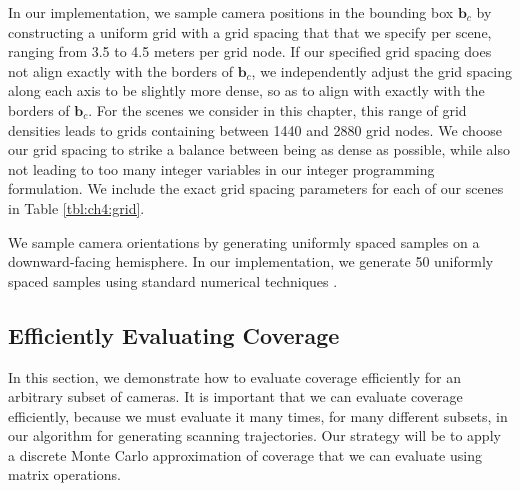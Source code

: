 In our implementation, we sample camera positions in the bounding box $\mathbf{b}_c$ by constructing a uniform grid with a grid spacing that that we specify per scene, ranging from 3.5 to 4.5 meters per grid node.
If our specified grid spacing does not align exactly with the borders of $\mathbf{b}_c$, we independently adjust the grid spacing along each axis to be slightly more dense, so as to align with exactly with the borders of $\mathbf{b}_c$.
For the scenes we consider in this chapter, this range of grid densities leads to grids containing between 1440 and 2880 grid nodes.
We choose our grid spacing to strike a balance between being as dense as possible, while also not leading to too many integer variables in our integer programming formulation. We include the exact grid spacing parameters for each of our scenes in Table \ref{tbl:ch4:grid}.

We sample camera orientations by generating uniformly spaced samples on a downward-facing hemisphere.
In our implementation, we generate 50 uniformly spaced samples using standard numerical techniques \cite{devert:2012}.

\subsection{Efficiently Evaluating Coverage}
\label{sec:ch4:eval_coverage}

In this section, we demonstrate how to evaluate coverage efficiently for an arbitrary subset of cameras. 
It is important that we can evaluate coverage efficiently, because we must evaluate it many times, for many different subsets, in our algorithm for generating scanning trajectories.
Our strategy will be to apply a discrete Monte Carlo approximation of coverage that we can evaluate using matrix operations. 

